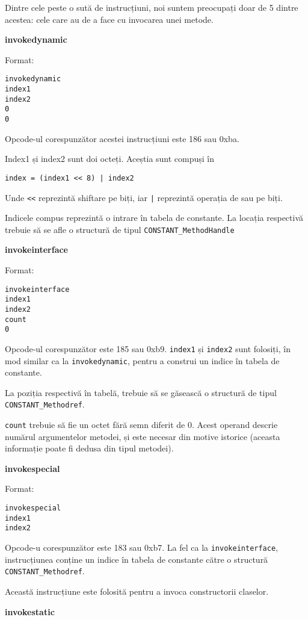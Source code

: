 Dintre cele peste o sută de instrucțiuni, noi suntem preocupați doar de
5 dintre acestea: cele care au de a face cu invocarea unei metode.

\textbf{invokedynamic}

Format:
\begin{verbatim}
invokedynamic
index1
index2
0
0
\end{verbatim}

Opcode-ul corespunzător acestei instrucțiuni este 186 sau
0xba.

Index1 și index2 sunt doi octeți. Aceștia sunt compuși în
\begin{lstlisting}
index = (index1 << 8) | index2
\end{lstlisting}
Unde \texttt{<<} reprezintă shiftare pe biți, iar \texttt{|}
reprezintă operația de sau pe biți.

Indicele compus reprezintă o intrare în tabela de constante. La locația
respectivă trebuie să se afle o structură de tipul
\texttt{CONSTANT\_MethodHandle}

\textbf{invokeinterface}

Format:
\begin{verbatim}
invokeinterface
index1
index2
count
0
\end{verbatim}

Opcode-ul corespunzător este 185 sau 0xb9.
\texttt{index1} și \texttt{index2} sunt folosiți, în mod similar ca la
\texttt{invokedynamic}, pentru a construi un indice în tabela
de constante.

La poziția respectivă în tabelă, trebuie să se găsească o structură de
tipul \texttt{CONSTANT\_Methodref}.

\texttt{count} trebuie să fie un octet fără semn diferit de 0. Acest
operand descrie numărul argumentelor metodei, și este necesar din motive
istorice (aceasta informație poate fi dedusa din tipul metodei).

\textbf{invokespecial}

Format:
\begin{verbatim}
invokespecial
index1
index2
\end{verbatim}

Opcode-u corespunzător este 183 sau 0xb7. La fel ca la
\texttt{invokeinterface}, instrucțiunea conține un indice în tabela de constante
către o structură \texttt{CONSTANT\_Methodref}.

Această instrucțiune este folosită pentru a invoca constructorii
claselor.

\textbf{invokestatic}

